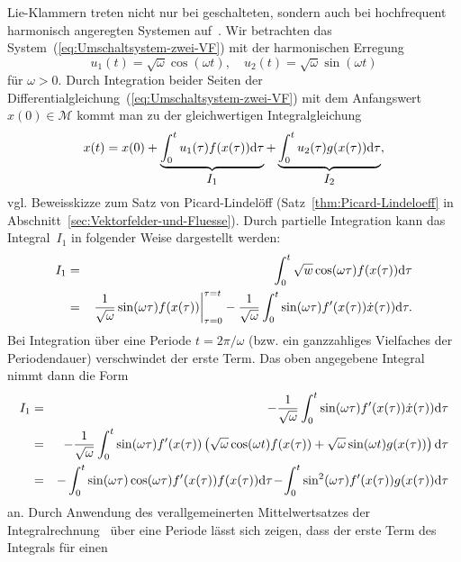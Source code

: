 Lie-Klammern treten nicht nur bei geschalteten, sondern auch bei hochfrequent
harmonisch angeregten Systemen auf~\cite{sussmann1993}. Wir betrachten
das System~(\ref{eq:Umschaltsystem-zwei-VF}) mit der harmonischen
Erregung 
\begin{equation}
u_{1}(t)=\sqrt{\omega}\cos(\omega t),\quad u_{2}(t)=\sqrt{\omega}\sin(\omega t)\label{eq:harmonisch-hochfreq-Erregung}
\end{equation}
für $\omega>0$. Durch Integration beider Seiten der Differentialgleichung~(\ref{eq:Umschaltsystem-zwei-VF})
mit dem Anfangswert $x(0)\in\mathcal{M}$ kommt man zu der gleichwertigen
Integralgleichung 
\begin{equation}
x(t)=x(0)+\underbrace{\int_{0}^{t}u_{1}(\tau)f(x(\tau)){\mathrm{d}}\tau}_{{\displaystyle I_{1}}}+\underbrace{\int_{0}^{t}u_{2}(\tau)g(x(\tau)){\mathrm{d}}\tau}_{{\displaystyle I_{2}}},\label{eq:Lie-harmonische-Anregung-Integralgleichung}
\end{equation}
vgl. Beweisskizze zum Satz von Picard-Lindelöff (Satz~\ref{thm:Picard-Lindeloeff}
in Abschnitt~\ref{sec:Vektorfelder-und-Fluesse}). Durch partielle
Integration kann das Integral~$I_{1}$ in folgender Weise dargestellt
werden: 
\begin{eqnarray*}
I_{1} & = & \int_{0}^{t}\sqrt{w}\cos(\omega\tau)f(x(\tau)){\mathrm{d}}\tau\\
 & = & \left.\frac{1}{\sqrt{\omega}}\sin(\omega\tau)f(x(\tau))\right|_{\tau=0}^{\tau=t}-\frac{1}{\sqrt{\omega}}\int_{0}^{t}\sin(\omega\tau)f^{\prime}(x(\tau))\dot{x}(\tau)){\mathrm{d}}\tau.
\end{eqnarray*}
Bei Integration über eine Periode $t=2\pi/\omega$ (bzw. ein ganzzahliges
Vielfaches der Periodendauer) verschwindet der erste Term. Das oben
angegebene Integral nimmt dann die Form 
\begin{eqnarray*}
I_{1} & = & -\frac{1}{\sqrt{\omega}}\int_{0}^{t}\sin(\omega\tau)f^{\prime}(x(\tau))\dot{x}(\tau)){\mathrm{d}}\tau\\
 & = & -\frac{1}{\sqrt{\omega}}\int_{0}^{t}\sin(\omega\tau)f^{\prime}(x(\tau))\left(\sqrt{\omega}\cos(\omega t)f(x(\tau))+\sqrt{\omega}\sin(\omega t)g(x(\tau))\right){\mathrm{d}}\tau\\
 & = & -\int_{0}^{t}\sin(\omega\tau)\cos(\omega\tau)f^{\prime}(x(\tau))f(x(\tau)){\mathrm{d}}\tau\!-\!\int_{0}^{t}\sin^{2}(\omega\tau)f^{\prime}(x(\tau))g(x(\tau)){\mathrm{d}}\tau
\end{eqnarray*}
an. Durch Anwendung des verallgemeinerten Mittelwertsatzes
der Integralrechnung~\cite[Satz~{2.35}]{baerwolff2006} über eine
Periode lässt sich zeigen, dass der erste Term des Integrals für einen
